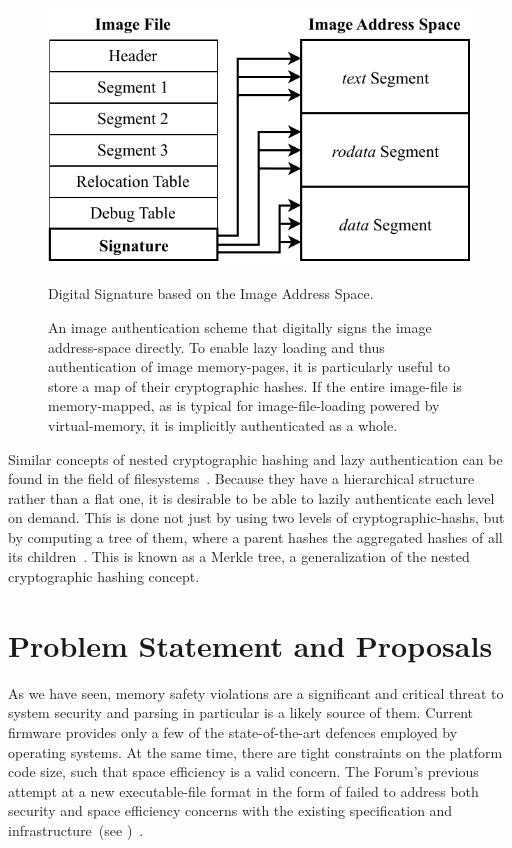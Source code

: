 \begin{figure}[htb]
  \centering
  \includegraphics{Figures/SignatureAlt.pdf}
  \caption{Digital Signature based on the Image Address Space.}
  \label{fig:img_sig}
  \caption*{An \gls{image} authentication scheme that digitally signs the \gls{image} \gls{address-space} directly. To enable lazy loading and thus authentication of \gls{image} \glspl{memory-page}, it is particularly useful to store a map of their cryptographic hashes. If the entire \gls{image-file} is memory-mapped, as is typical for \gls{image-file-loading} powered by \gls{virtual-memory}, it is implicitly authenticated as a whole.}
\end{figure}

Similar concepts of nested cryptographic hashing and lazy authentication can be found in the field of filesystems~\cite{apfs}. Because they have a hierarchical structure rather than a flat one, it is desirable to be able to lazily authenticate each level on demand. This is done not just by using two levels of \glspl{cryptographic-hash}, but by computing a tree of them, where a parent hashes the aggregated hashes of all its children~\cite{merkle-trees}. This is known as a Merkle tree, a generalization of the nested cryptographic hashing concept.

\section{Problem Statement and Proposals}
\label{sec:problem_statement}

As we have seen, memory safety violations are a significant and critical threat to system security and parsing in particular is a likely source of them. Current  \gls{firmware} provides only a few of the state-of-the-art defences employed by operating systems. At the same time, there are tight constraints on the platform code size, such that space efficiency is a valid concern. The  Forum's previous attempt at a new \gls{executable-file} format in the form of  failed to address both security and space efficiency concerns with the existing  specification and infrastructure~(see )~\cite{secure-pe}.

